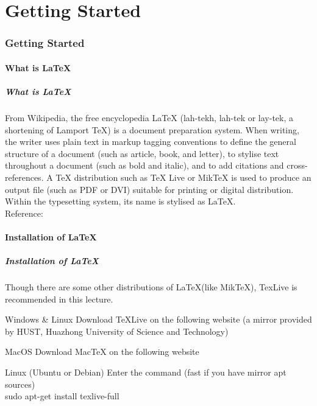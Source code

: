 \part{Getting Started}

\section{Getting Started}
\begin{frame}
\end{frame}

\subsection{What is \LaTeX}

\begin{frame}
	\frametitle{What is \LaTeX}
	\begin{block}{From Wikipedia, the free encyclopedia}
		LaTeX (lah-tekh, lah-tek or lay-tek, a shortening of Lamport TeX) is a document preparation system. When writing, the writer uses plain text in markup tagging conventions to define the general structure of a document (such as article, book, and letter), to stylise text throughout a document (such as bold and italic), and to add citations and cross-references. A TeX distribution such as TeX Live or MikTeX is used to produce an output file (such as PDF or DVI) suitable for printing or digital distribution. Within the typesetting system, its name is stylised as \LaTeX.	\\[0.5em]
	Reference: 
	\end{block}

\end{frame}

\subsection{Installation of \LaTeX}
\begin{frame}
	\frametitle{Installation of \LaTeX}
	Though there are some other distributions of \LaTeX (like MikTeX), TexLive is recommended in this lecture.
	\begin{block}{Windows \& Linux}
		Download TeXLive on the following website (a mirror provided by HUST, Huazhong University of Science and Technology) \\
	\end{block}
	\begin{block}{MacOS}
		Download MacTeX on the following website\\
	\end{block}
	\begin{block}{Linux (Ubuntu or Debian)}
		Enter the command (fast if you have mirror apt sources) \\
		\alert{sudo apt-get install texlive-full}
	\end{block}
\end{frame}

